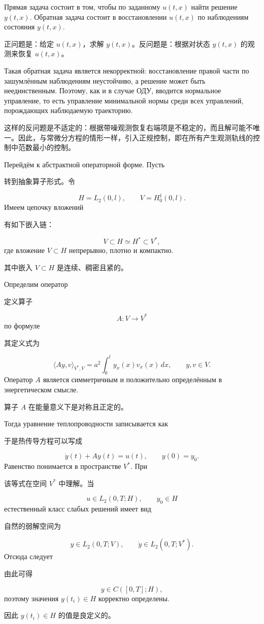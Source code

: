 \documentclass[12pt,a4paper]{article}
\newcommand{\dd}{\,d}
\newcommand{\zh}[1]{\par\noindent #1\par}
\begin{document}
Прямая задача состоит в том, чтобы по заданному $u(t,x)$ найти решение $y(t,x)$. Обратная задача состоит в восстановлении $u(t,x)$ по наблюдениям состояния $y(t,x)$.
\zh{正问题是：给定 $u(t,x)$，求解 $y(t,x)$。反问题是：根据对状态 $y(t,x)$ 的观测来恢复 $u(t,x)$。}

Такая обратная задача является некорректной: восстановление правой части по зашумлённым наблюдениям неустойчиво, а решение может быть неединственным. Поэтому, как и в случае ОДУ, вводится нормальное управление, то есть управление минимальной нормы среди всех управлений, порождающих наблюдаемую траекторию.
\zh{这样的反问题是不适定的：根据带噪观测恢复右端项是不稳定的，而且解可能不唯一。因此，与常微分方程的情形一样，引入正规控制，即在所有产生观测轨线的控制中范数最小的控制。}

Перейдём к абстрактной операторной форме. Пусть
\zh{转到抽象算子形式。令}
\[
    H=L_2(0,l),\qquad V=H_0^1(0,l).
\]
Имеем цепочку вложений
\zh{有如下嵌入链：}
\begin{equation}
    V\subset H\simeq H^*\subset V^*,
\end{equation}
где вложение $V\subset H$ непрерывно, плотно и компактно.
\zh{其中嵌入 $V\subset H$ 是连续、稠密且紧的。}

Определим оператор
\zh{定义算子}
\[
    A:V\to V^*
\]
по формуле
\zh{其定义式为}
\begin{equation}
    \langle Ay,v\rangle_{V^*,V}
    =a^2\int_0^l y_x(x)v_x(x)\dd x,
    \qquad y,v\in V.
\end{equation}
Оператор $A$ является симметричным и положительно определённым в энергетическом смысле.
\zh{算子 $A$ 在能量意义下是对称且正定的。}

Тогда уравнение теплопроводности записывается как
\zh{于是热传导方程可以写成}
\begin{equation}
    \dot y(t)+Ay(t)=u(t),\qquad y(0)=y_0.
\end{equation}
Равенство понимается в пространстве $V^*$. При
\zh{该等式在空间 $V^*$ 中理解。当}
\[
    u\in L_2(0,T;H),\qquad y_0\in H
\]
естественный класс слабых решений имеет вид
\zh{自然的弱解空间为}
\begin{equation}
    y\in L_2(0,T;V),\qquad \dot y\in L_2(0,T;V^*).
\end{equation}
Отсюда следует
\zh{由此可得}
\begin{equation}
    y\in C([0,T];H),
\end{equation}
поэтому значения $y(t_i)\in H$ корректно определены.
\zh{因此 $y(t_i)\in H$ 的值是良定义的。}
\end{document}
